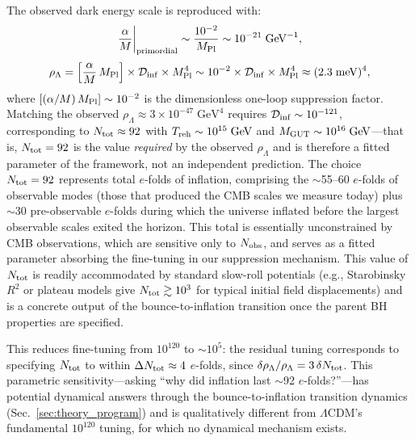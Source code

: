 \documentclass[aps,prd,twocolumn,superscriptaddress,showpacs,preprintnumbers,nofootinbib,longbibliography,floatfix]{revtex4-2}
\newcommand{\Dinf}{\mathcal{D}_{\rm inf}}
\newcommand{\MPl}{M_{\rm Pl}}
\begin{document}
The observed dark energy scale is reproduced with:
\begin{equation}
\frac{\alpha}{M}\bigg|_{\rm primordial} \sim \frac{10^{-2}}{\MPl} \sim 10^{-21}\;\text{GeV}^{-1},
\end{equation}
\begin{equation}\label{eq:rhoLambda}
\rho_\Lambda = \left[\frac{\alpha}{M}\,\MPl\right]\times\Dinf\times\MPl^4 \sim 10^{-2}\times\Dinf\times\MPl^4 \approx (2.3\;\text{meV})^4,
\end{equation}
where $[(\alpha/M)\,\MPl]\sim 10^{-2}$ is the dimensionless one-loop suppression factor. Matching the observed $\rho_\Lambda\approx 3\times 10^{-47}\;\text{GeV}^4$ requires $\Dinf\sim 10^{-121}$, corresponding to $N_{\rm tot}\approx 92$ with $T_{\rm reh}\sim 10^{15}\;\text{GeV}$ and $M_{\rm GUT}\sim 10^{16}\;\text{GeV}$---that is, $N_{\rm tot} = 92$ is the value \textit{required} by the observed $\rho_\Lambda$ and is therefore a fitted parameter of the framework, not an independent prediction. The choice $N_{\rm tot} = 92$ represents total $e$-folds of inflation, comprising the $\sim$55--60 $e$-folds of observable modes (those that produced the CMB scales we measure today) plus $\sim$30 pre-observable $e$-folds during which the universe inflated before the largest observable scales exited the horizon. This total is essentially unconstrained by CMB observations, which are sensitive only to $N_{\rm obs}$, and serves as a fitted parameter absorbing the fine-tuning in our suppression mechanism. This value of $N_{\rm tot}$ is readily accommodated by standard slow-roll potentials (e.g., Starobinsky $R^2$ or plateau models give $N_{\rm tot}\gtrsim 10^3$ for typical initial field displacements) and is a concrete output of the bounce-to-inflation transition once the parent BH properties are specified.

This reduces fine-tuning from $10^{120}$ to $\sim 10^5$: the residual tuning corresponds to specifying $N_{\rm tot}$ to within $\Delta N_{\rm tot}\approx 4$ $e$-folds, since $\delta\rho_\Lambda/\rho_\Lambda = 3\,\delta N_{\rm tot}$. This parametric sensitivity---asking ``why did inflation last $\sim$92 $e$-folds?''---has potential dynamical answers through the bounce-to-inflation transition dynamics (Sec.~\ref{sec:theory_program}) and is qualitatively different from $\Lambda$CDM's fundamental $10^{120}$ tuning, for which no dynamical mechanism exists.
\end{document}
